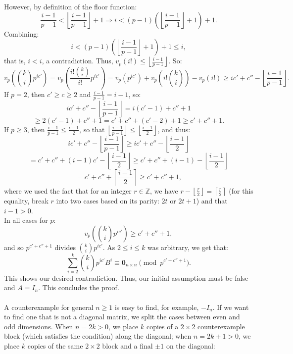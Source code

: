 \begin{solution}
\[    \]
    However, by definition of the floor function:
    \[
        \frac{i-1}{p-1} < \left\lfloor \frac{i-1}{p-1} \right\rfloor + 1 \Rightarrow i < \left( p-1 \right)\left( \left\lfloor \frac{i-1}{p-1} \right\rfloor + 1 \right) + 1.
    \]
    Combining:
    \[
        i < \left( p-1 \right)\left( \left\lfloor \frac{i-1}{p-1} \right\rfloor + 1 \right) + 1 \leq i,
    \]
    that is, \( i < i \), a contradiction. Thus, \( v_p\left( i! \right) \leq \left\lfloor \frac{i-1}{p-1} \right\rfloor \). So:
    \[
        v_p\left( \binom{k}{i} p^{i c'} \right) = v_p\left( \frac{i! \binom{k}{i}}{i!} p^{i c'} \right) = v_p\left( p^{i c'} \right) + v_p\left( i! \binom{k}{i} \right) - v_p\left( i! \right) \geq i c' + c'' - \left\lfloor \frac{i-1}{p-1} \right\rfloor.
    \]
    If \( p = 2 \), then \( c' \geq c \geq 2 \) and \( \frac{i-1}{p-1} = i - 1 \), so:
    \[
        i c' + c'' - \left\lfloor \frac{i-1}{p-1} \right\rfloor = i\left( c' - 1 \right) + c'' + 1
    \]
    \[\geq 2\left( c' - 1 \right) + c'' + 1 = c' + c'' + \left( c' - 2 \right) + 1 \geq c' + c'' +
        1.
    \]
    If \( p \geq 3 \), then \( \frac{i-1}{p-1} \leq \frac{i-1}{2} \), so that \( \left\lfloor \frac{i-1}{p-1} \right\rfloor \leq \left\lfloor \frac{i-1}{2} \right\rfloor \), and thus:
    \[
        i c' + c'' - \left\lfloor \frac{i-1}{p-1} \right\rfloor \geq i c' + c'' - \left\lfloor \frac{i-1}{2} \right\rfloor
    \]
    \[= c' + c'' + \left( i - 1 \right)c' - \left\lfloor \frac{i-1}{2} \right\rfloor \geq c' + c'' +
        \left( i - 1 \right) - \left\lfloor \frac{i-1}{2} \right\rfloor
    \]
    \[= c' + c'' + \left\lceil \frac{i-1}{2} \right\rceil \geq c' + c'' + 1,
    \]
    where we used the fact that for an integer \( r \in \mathbb{Z} \), we have \( r - \left\lfloor \frac{r}{2} \right\rfloor = \left\lceil \frac{r}{2} \right\rceil \) (for this equality, break \( r \) into two cases based on its parity: \( 2t \) or \( 2t + 1 \)) and that \( i - 1 > 0 \). \\
    In all cases for \( p \):
    \[
        v_p\left( \binom{k}{i} p^{i c'} \right) \geq c' + c'' + 1,
    \]
    and so \( p^{c' + c'' + 1} \) divides \( \binom{k}{i} p^{i c'} \). As \( 2\leq i\leq k \) was arbitrary, we get that:
    \[
        \sum_{i=2}^{k} \binom{k}{i} p^{i c'} B^i \equiv \mathbf{0}_{n \times n} \pmod{p^{c' + c'' + 1}}.
    \]
    This shows our desired contradiction. Thus, our initial assumption must be false and \( A = I_n \). This concludes the proof.
    \\\\
    A counterexample for general \( n\geq 1 \) is easy to find, for example, \( -I_n \). If we want to find one that is not a diagonal matrix, we split the cases between even and odd dimensions. When \( n=2k>0 \), we place \( k \) copies of a \( 2 \times 2 \) counterexample block (which satisfies the condition) along the diagonal; when \( n=2k+1>0 \), we place \( k \) copies of the same \( 2 \times 2 \) block and a final \( \pm 1 \) on the diagonal:

\end{solution}
